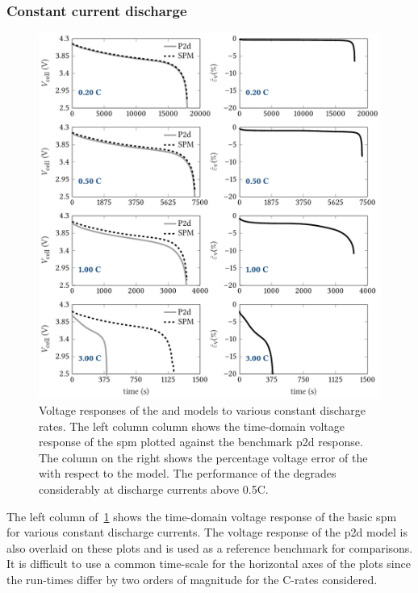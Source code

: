 \subsubsection*{Constant current discharge}\label{subsubsec:cnstcurrdischgsim}

\begin{figure}[!htb]
    \centering
    \includegraphics[width=\textwidth]{4/figures/const_curr_dischg_voltage.pdf}
    \caption[Voltage responses of  and  to
    constant current discharge]{Voltage responses of the  and
         models to various constant discharge rates. The left
        column column shows the time-domain voltage response of the \gls{spm}
        plotted against the benchmark \gls{p2d} response. The column on the
        right shows the percentage voltage error of the  with
        respect to the  model. The performance of the
         degrades considerably at discharge currents above
    0.5C.}
    \label{fig:cnstdischgspmp2dvoltage}
\end{figure}

The  left  column  of~\cref{fig:cnstdischgspmp2dvoltage} shows  the  time-domain
voltage response of the basic \gls{spm} for various constant discharge currents.
The voltage response of the \gls{p2d} model  is also overlaid on these plots and
is used  as a  reference benchmark  for comparisons.  It is  difficult to  use a
common  time-scale for  the horizontal  axes of  the plots  since the  run-times
differ by two orders of magnitude for the C-rates considered.

